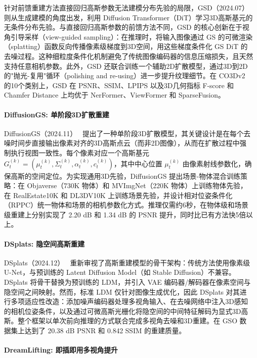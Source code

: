 针对前馈重建方法直接回归高斯参数无法建模分布先验的局限，GSD（2024.07）~\cite{2407_04237} 则从生成建模的角度出发，利用 Diffusion Transformer（DiT）学习3D高斯基元的无条件分布先验。与直接回归高斯参数的前馈方法不同，GSD 的核心创新在于视角引导采样（view-guided sampling）：在推理时，将输入图像通过 GS 的可微渲染（splatting）函数反向传播像素级梯度到3D空间，用这些梯度条件化 GS DiT 的去噪过程。这种细粒度条件化机制避免了传统图像编码器的信息压缩损失，且天然支持任意相机参数。此外，GSD 还联合训练一个辅助2D扩散模型，通过3D到2D的"抛光-复用"循环（polishing and re-using）进一步提升纹理细节。在 CO3Dv2 的10个类别上，GSD 在 PSNR、SSIM、LPIPS 以及3D几何指标 F-score 和 Chamfer Distance 上均优于 NerFormer、ViewFormer 和 SparseFusion。

\paragraph{DiffusionGS: 单阶段3D扩散重建}

DiffusionGS（2024.11）~\cite{2411_14384} 提出了一种单阶段3D扩散模型，其关键设计是在每个去噪时间步直接输出像素对齐的3D高斯点云（而非2D图像），从而在扩散过程中强制执行视图一致性。每个像素对应一个高斯基元 $G_t^{(k)} = (\mu_t^{(k)}, \Sigma_t^{(k)}, \alpha_t^{(k)}, c_t^{(k)})$，其中中心位置 $\mu_t^{(k)}$ 由像素射线参数化，确保高斯的空间定位。为实现通用3D先验，DiffusionGS 提出场景-物体混合训练策略：在 Objaverse（730K 物体）和 MVImgNet（220K 物体）上训练物体先验，在 RealEstate10K 和 DL3DV10K 上训练场景先验，并设计相对位姿条件化（RPPC）统一物体和场景的相机参数化方式。推理仅需约6秒，在物体级和场景级重建上分别实现了 2.20 dB 和 1.34 dB 的 PSNR 提升，同时比已有方法快5倍以上。

\paragraph{DSplats: 隐空间高斯重建}

DSplats（2024.12）~\cite{2412_09648} 重新审视了高斯重建模型的骨干架构：传统方法使用像素级 U-Net，与预训练的 Latent Diffusion Model（如 Stable Diffusion）不兼容。DSplats 将骨干替换为预训练的 LDM，并引入 VAE 编码器/解码器在像素空间与隐空间之间映射。然而，标准 LDM 仅针对图像生成优化，因此 DSplats 对其进行多项适应性改造：添加噪声编码器处理多视角输入、在去噪网络中注入3D感知的相机位姿条件，以及通过可微高斯光栅化将隐空间的中间特征解码为显式3D高斯。整个框架以单次前向推理的方式联合完成多视角去噪和3D重建。在 GSO 数据集上达到了 20.38 dB PSNR 和 0.842 SSIM 的重建质量。

\paragraph{DreamLifting: 即插即用多视角提升}

